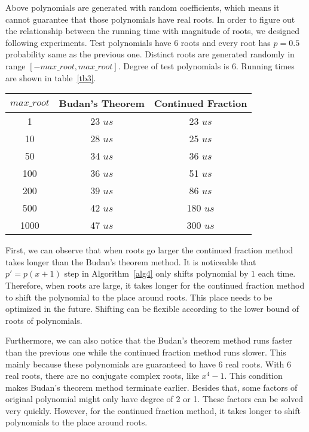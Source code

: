Above polynomials are generated with random coefficients, which means it cannot
guarantee that those polynomials have real roots. In order to figure out the
relationship between the running time with magnitude of roots, we designed
following experiments. Test polynomials have 6 roots and every root has $p =
0.5$ probability same as the previous one. Distinct roots are generated randomly
in range $[-max\_root, max\_root]$. Degree of test polynomials is 6. Running
times are shown in table~\ref{tb3}.


\begin{center}
\label{tb3}
\begin{tabular}{ |c|c|c| } 
 \hline

 $max\_root$  & Budan's Theorem & Continued Fraction\\ 

 \hline
 1   & 23 $us$  & 23 $us$\\ 
 10   & 28 $us$  & 25 $us$\\ 
 50   & 34 $us$  & 36 $us$\\ 
 100   & 36 $us$  & 51 $us$\\ 
 200   & 39 $us$  & 86 $us$\\ 
 500   & 42 $us$  & 180 $us$\\ 
 1000   & 47 $us$  & 300 $us$\\ 
 \hline
\end{tabular}
\end{center}

First, we can observe that when roots go larger the continued fraction method
takes longer than the Budan's theorem method. It is noticeable that $p'=p(x+1)$
step in Algorithm~\ref{alg4} only shifts polynomial by $1$ each time. Therefore,
when roots are large, it takes longer for the continued fraction method to shift
the polynomial to the place around roots. This place needs to be optimized in
the future.  Shifting can be flexible according to the lower bound of roots of
polynomials.

Furthermore, we can also notice that the Budan’s theorem method runs faster than the 
previous one while the continued fraction method runs slower. This mainly
because these polynomials are guaranteed to have 6 real roots. With 6 real
roots, there are no conjugate complex roots, like $x^4-1$. This condition makes
Budan’s theorem method terminate earlier. Besides that, some factors of original
polynomial might only have degree of 2 or 1. These factors can be solved very
quickly. However, for the continued fraction method, it takes longer to shift
polynomials to the place around roots.

